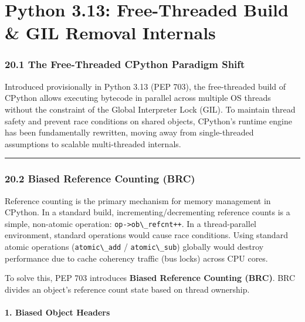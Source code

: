 \hypertarget{python-3.13-free-threaded-build-gil-removal-internals}{%
\chapter{Python 3.13: Free-Threaded Build \& GIL Removal
Internals}\label{python-3.13-free-threaded-build-gil-removal-internals}}

\hypertarget{the-free-threaded-cpython-paradigm-shift}{%
\subsection{20.1 The Free-Threaded CPython Paradigm
Shift}\label{the-free-threaded-cpython-paradigm-shift}}

Introduced provisionally in Python 3.13 (PEP 703), the free-threaded
build of CPython allows executing bytecode in parallel across multiple
OS threads without the constraint of the Global Interpreter Lock (GIL).
To maintain thread safety and prevent race conditions on shared objects,
CPython's runtime engine has been fundamentally rewritten, moving away
from single-threaded assumptions to scalable multi-threaded internals.

\begin{center}\rule{0.5\linewidth}{0.5pt}\end{center}

\hypertarget{biased-reference-counting-brc}{%
\subsection{20.2 Biased Reference Counting
(BRC)}\label{biased-reference-counting-brc}}

Reference counting is the primary mechanism for memory management in
CPython. In a standard build, incrementing/decrementing reference counts
is a simple, non-atomic operation:
\passthrough{\lstinline!op->ob\_refcnt++!}. In a thread-parallel
environment, standard operations would cause race conditions. Using
standard atomic operations (\passthrough{\lstinline!atomic\_add!} /
\passthrough{\lstinline!atomic\_sub!}) globally would destroy
performance due to cache coherency traffic (bus locks) across CPU cores.

To solve this, PEP 703 introduces \textbf{Biased Reference Counting
(BRC)}. BRC divides an object's reference count state based on thread
ownership.

\hypertarget{biased-object-headers}{%
\subsubsection{1. Biased Object Headers}\label{biased-object-headers}}

